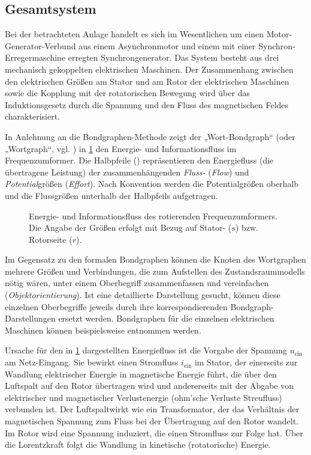 \subsection{Gesamtsystem}\label{sec:gesamtsystem}

Bei der betrachteten Anlage handelt es sich im Wesentlichen um einen Motor-Generator-Verbund aus einem Asynchronmotor und einem mit einer Synchron-Erregermaschine erregten Synchrongenerator. Das System besteht aus drei mechanisch gekoppelten elektrischen Maschinen. Der Zusammenhang zwischen den elektrischen Größen am Stator und am Rotor der elektrischen Maschinen sowie die Kopplung mit der rotatorischen Bewegung wird über das Induktionsgesetz durch die Spannung und den Fluss des magnetischen Feldes charakterisiert.

In Anlehnung an die Bondgraphen-Methode zeigt der „Wort-Bondgraph“ (oder „Wortgraph“, vgl. \cite[S.~10]{roddeckBondgraphenModellbildungUnd2019}) in \cref{fig:Wirkungsgraph} den Energie- und Informationsfluss im Frequenzumformer. Die Halbpfeile (\bond) repräsentieren den Energiefluss (die übertragene Leistung) der zusammenhängenden \emph{Fluss-} (\emph{Flow}) und \emph{Potential}größen (\emph{Effort}). Nach Konvention werden die Potentialgrößen oberhalb und die Flussgrößen unterhalb der Halbpfeils aufgetragen. 

\begin{figure}
    \centering
    
    \caption{Energie- und Informationsfluss des rotierenden Frequenzumformers. Die Angabe der Größen erfolgt mit Bezug auf Stator- ($s$) bzw. Rotorseite ($r$).}
    \label{fig:Wirkungsgraph}
\end{figure}

Im Gegensatz zu den formalen Bondgraphen können die Knoten des Wortgraphen mehrere Größen und Verbindungen, die zum Aufstellen des Zustandsraummodells nötig wären, unter einem Oberbegriff zusammenfassen und vereinfachen (\emph{Objektorientierung}). Ist eine detaillierte Darstellung gesucht, können diese einzelnen Oberbegriffe jeweils durch ihre korrespondierenden Bondgraph-Darstellungen ersetzt werden. Bondgraphen für die einzelnen elektrischen Maschinen können beispielsweise \cite[S.~269~ff.]{borutzkyBondGraphModelling2011} entnommen werden.

Ursache für den in \cref{fig:Wirkungsgraph} dargestellten Energiefluss ist die Vorgabe der Spannung $u_{\mathrm{ein}}$ am Netz-Eingang. Sie bewirkt einen Stromfluss $i_{\mathrm{ein}}$ im Stator, der einerseits zur Wandlung elektrischer Energie in magnetische Energie führt, die über den Luftspalt auf den Rotor übertragen wird und andererseits mit der Abgabe von elektrischer und magnetischer Verlustenergie (ohm'sche Verluste Streufluss) verbunden ist. Der Luftspaltwirkt wie ein Transformator, der das Verhältnis der magnetischen Spannung zum Fluss bei der Übertragung auf den Rotor  wandelt. Im Rotor wird eine Spannung induziert, die einen Stromfluss zur Folge hat. Über die Lorentzkraft folgt die Wandlung in kinetische (rotatorische) Energie.

